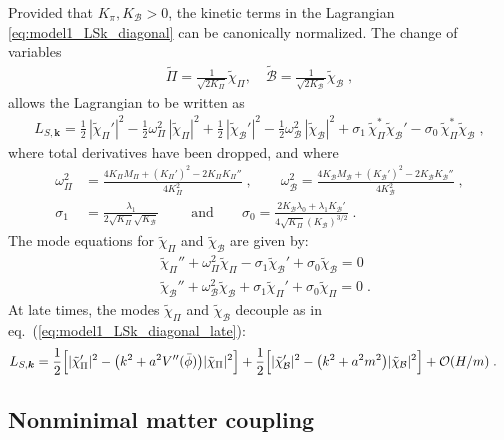 \documentclass[11pt,a4paper]{article}
\newcommand{\ba}[1]{\begin{align} #1 \end{align}}
\newcommand{\bes}[1]{\begin{equation}\begin{split} #1 \end{split}\end{equation}}
\newcommand{\kvec}{{\bm k}}
\newcommand{\LSk}{L_{S,\kvec}}
\newcommand{\eref}[1]{eq.~(\ref{#1})}
\begin{document}
Provided that $K_\pi, K_\mathcal{B} > 0$, the kinetic terms in the Lagrangian \eqref{eq:model1_LSk_diagonal} can be canonically normalized.  
The change of variables
\ba{\label{eq:chi_Pi_and_B}
    \tilde{\Pi} = \frac{1}{\sqrt{2 K_\Pi}} \tilde{\chi}_\Pi,\quad
    \tilde{\mathcal{B}} = \frac{1}{\sqrt{2 K_\mathcal{B}}} \tilde{\chi}_\mathcal{B}
    \;,
}
allows the Lagrangian to be written as 
\ba{\label{eq:L_chi_Pi_and_B}
    \LSk = 
    \frac12 \, | \tilde{\chi}_\Pi' |^2 
    - \frac12 \omega_\Pi^2 \, | {\tilde{\chi}_\Pi} |^2 
    + \frac12 \, | \tilde{\chi}_\mathcal{B}' |^2 
    - \frac12 \omega_\mathcal{B}^2 \, | {\tilde{\chi}_\mathcal{B}} |^2 
    + \sigma_1 \, \tilde{\chi}_\Pi^\ast \tilde{\chi}_\mathcal{B}' 
    - \sigma_0 \, \tilde{\chi}_\Pi^\ast \tilde{\chi}_\mathcal{B}
    \;,
}
where total derivatives have been dropped, and where 
\bes{
    \omega_\Pi^2 & = \frac{4 K_\Pi M_\Pi + (K_\Pi')^2 - 2 K_\Pi K_\Pi''}{4 K_\Pi^2} 
    \;, \qquad 
    \omega_\mathcal{B}^2 = \frac{4 K_\mathcal{B} M_\mathcal{B} + (K_\mathcal{B}')^2 - 2 K_\mathcal{B} K_\mathcal{B}''}{4 K_\mathcal{B}^2} 
    \;, \\
    \sigma_1 & = \frac{\lambda_1}{2 \sqrt{K_\Pi} \sqrt{K_\mathcal{B}} } 
    \; \qquad \text{and} \qquad 
    \sigma_0 = \frac{2 K_\mathcal{B} \lambda_0 + \lambda_1 K_\mathcal{B}' }{4 \sqrt{K_\Pi} (K_\mathcal{B})^{3/2} } 
    \;.
}
The mode equations for $\tilde{\chi}_\Pi$ and $\tilde{\chi}_\mathcal{B}$ are given by:
\bes{\label{eq:EOM_chi_Pi_and_B}
    & \tilde{\chi}_\Pi'' + \omega_\Pi^2 \tilde{\chi}_\Pi - \sigma_1 \tilde{\chi}_\mathcal{B}' + \sigma_0 \tilde{\chi}_\mathcal{B} = 0 \\
    & \tilde{\chi}_\mathcal{B}'' + \omega_\mathcal{B}^2 \tilde{\chi}_\mathcal{B} + \sigma_1 \tilde{\chi}_\Pi' + \sigma_0 \tilde{\chi}_\Pi = 0
    \;.
}
At late times, the modes $\tilde{\chi}_\Pi$ and $\tilde{\chi}_\mathcal{B}$ decouple as in \eref{eq:model1_LSk_diagonal_late}:
\ba{
    \LSk & =
    \frac{1}{2} \Big[ |\tilde{\chi}_\Pi'|^2 - \bigl( k^2 + a^2 V''(\bar{\phi}) \bigr) |\tilde{\chi}_\Pi|^2 \Big]
    + \frac12 \Big[ |\tilde{\chi}_\mathcal{B}'|^2 - \bigl( k^2 + a^2 m^2 \bigr) |\tilde{\chi}_\mathcal{B}|^2 \Big]
    + \order{H/m}
    \;.
}

\subsection{Nonminimal matter coupling}
\label{sub:nonminimal_matter_SVT}
\end{document}

